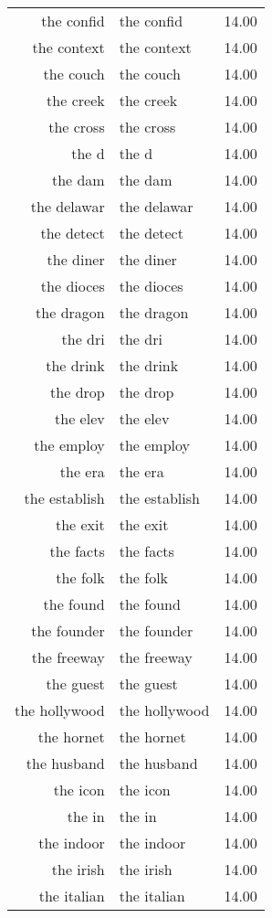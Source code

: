 \begin{table}[ht]
\begin{tabular}{rlr}
  the confid & the confid & 14.00 \\ 
  the context & the context & 14.00 \\ 
  the couch & the couch & 14.00 \\ 
  the creek & the creek & 14.00 \\ 
  the cross & the cross & 14.00 \\ 
  the d & the d & 14.00 \\ 
  the dam & the dam & 14.00 \\ 
  the delawar & the delawar & 14.00 \\ 
  the detect & the detect & 14.00 \\ 
  the diner & the diner & 14.00 \\ 
  the dioces & the dioces & 14.00 \\ 
  the dragon & the dragon & 14.00 \\ 
  the dri & the dri & 14.00 \\ 
  the drink & the drink & 14.00 \\ 
  the drop & the drop & 14.00 \\ 
  the elev & the elev & 14.00 \\ 
  the employ & the employ & 14.00 \\ 
  the era & the era & 14.00 \\ 
  the establish & the establish & 14.00 \\ 
  the exit & the exit & 14.00 \\ 
  the facts & the facts & 14.00 \\ 
  the folk & the folk & 14.00 \\ 
  the found & the found & 14.00 \\ 
  the founder & the founder & 14.00 \\ 
  the freeway & the freeway & 14.00 \\ 
  the guest & the guest & 14.00 \\ 
  the hollywood & the hollywood & 14.00 \\ 
  the hornet & the hornet & 14.00 \\ 
  the husband & the husband & 14.00 \\ 
  the icon & the icon & 14.00 \\ 
  the in & the in & 14.00 \\ 
  the indoor & the indoor & 14.00 \\ 
  the irish & the irish & 14.00 \\ 
  the italian & the italian & 14.00 \\ 

\end{tabular}
\end{table}
